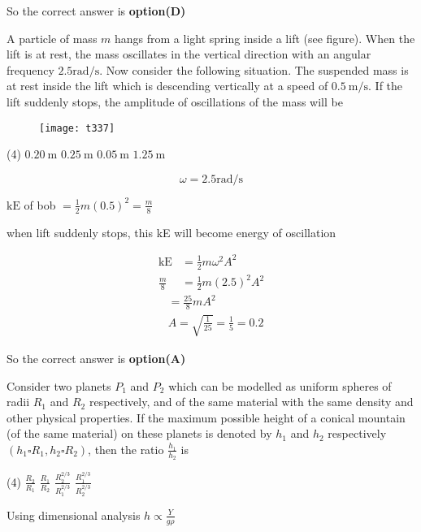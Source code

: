 \begin{questions}
\begin{answer}
	So the correct answer is \textbf{option(D)}
\end{answer}
\begin{minipage}{\textwidth}
	\question A particle of mass $m$ hangs from a light spring inside a lift (see figure). When the lift is at rest, the mass oscillates in the vertical direction with an angular frequency $2.5 \mathrm{rad} / \mathrm{s}$. Now consider the following situation.
	The suspended mass is at rest inside the lift which is descending vertically at a speed of $0.5 \mathrm{~m} / \mathrm{s}$. If the lift suddenly stops, the amplitude of oscillations of the mass will be
\end{minipage}
\begin{figure}[H]
	\centering
	\texttt{[image: t337]}
\end{figure}
\begin{tasks}(4)
	\task[\textbf{A.}] $0.20 \mathrm{~m}$
	\task[\textbf{B.}] $0.25 \mathrm{~m}$
	\task[\textbf{C.}] $0.05 \mathrm{~m}$
	\task[\textbf{D.}] $1.25 \mathrm{~m}$
\end{tasks}
\begin{answer}
	$$
	\omega=2.5 \mathrm{rad} / \mathrm{s}
	$$
	
	$\mathrm{kE}$ of bob $=\frac{1}{2} m(0.5)^{2}=\frac{m}{8}$
	
	when lift suddenly stops, this kE will become energy of oscillation
	
	$$
	\begin{aligned}
	\mathrm{kE} &=\frac{1}{2} m \omega^{2} A^{2} \\
	\frac{m}{8} &=\frac{1}{2} m(2.5)^{2} A^{2}
	\end{aligned}
	$$
	$$
	\begin{aligned}
	&=\frac{25}{8} m A^{2} \\
	&A=\sqrt{\frac{1}{25}}=\frac{1}{5}=0.2
	\end{aligned}
	$$
	
	So the correct answer is \textbf{option(A)}
\end{answer}
\begin{minipage}{\textwidth}
	\question Consider two planets $P_{1}$ and $P_{2}$ which can be modelled as uniform spheres of radii $R_{1}$ and $R_{2}$ respectively, and of the same material with the same density and other physical properties. If the maximum possible height of a conical mountain (of the same material) on these planets is denoted by $h_{1}$ and $h_{2}$ respectively $\left(h_{1} \square R_{1}, h_{2} \square R_{2}\right)$, then the ratio $\frac{h_{1}}{h_{2}}$ is
\end{minipage}
\begin{tasks}(4)
	\task[\textbf{A.}] $\frac{R_{2}}{R_{1}}$
	\task[\textbf{B.}]   $\frac{R_{1}}{R_{2}}$
	\task[\textbf{C.}] $\frac{R_{2}^{2 / 3}}{R_{1}^{2 / 3}}$
	\task[\textbf{D.}]   $\frac{R_{1}^{2 / 3}}{R_{2}^{2 / 3}}$
\end{tasks}
\begin{answer}
	Using dimensional analysis $h \propto \frac{Y}{g \rho}$
	

\end{answer}
\end{questions}
